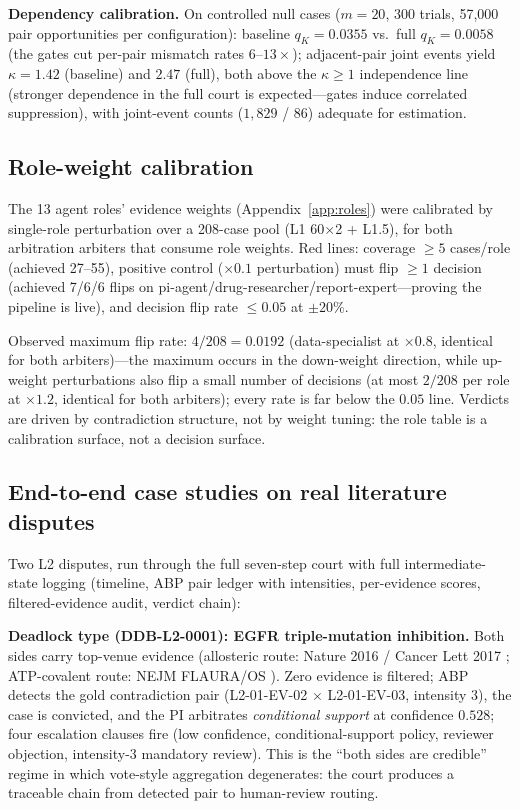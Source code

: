 \documentclass[11pt]{article}
\begin{document}
\textbf{Dependency calibration.} On controlled null cases ($m=20$, 300
trials, 57{,}000 pair opportunities per configuration): baseline
$q_K=0.0355$ vs.\ full $q_K=0.0058$ (the gates cut per-pair mismatch rates
$6$--$13\times$); adjacent-pair joint events yield $\kappa=1.42$ (baseline)
and $2.47$ (full), both above the $\kappa\geq1$ independence line
(stronger dependence in the full court is expected—gates induce
correlated suppression), with joint-event counts ($1{,}829$ / $86$)
adequate for estimation.

\subsection{Role-weight calibration}\label{sec:roles}

The 13 agent roles' evidence weights (Appendix~\ref{app:roles}) were
calibrated by single-role perturbation over a 208-case pool (L1 60$\times$2
+ L1.5), for both arbitration arbiters that consume role weights. Red
lines: coverage $\geq5$ cases/role (achieved 27--55), positive control
($\times0.1$ perturbation) must flip $\geq1$ decision (achieved 7/6/6 flips
on pi-agent/drug-researcher/report-expert—proving the pipeline is live),
and decision flip rate $\leq0.05$ at $\pm20\%$.

Observed maximum flip rate: $4/208=0.0192$ (data-specialist at
$\times0.8$, identical for both arbiters)—the maximum occurs in the
down-weight direction, while up-weight perturbations also flip a small
number of decisions (at most $2/208$ per role at $\times1.2$, identical
for both arbiters); every rate is far below the $0.05$ line. Verdicts are
driven by contradiction structure, not by weight tuning: the role table is
a calibration surface, not a decision surface.

\subsection{End-to-end case studies on real literature disputes}\label{sec:casestudy}

Two L2 disputes, run through the full seven-step court with full
intermediate-state logging (timeline, ABP pair ledger with intensities,
per-evidence scores, filtered-evidence audit, verdict chain):

\textbf{Deadlock type (DDB-L2-0001): EGFR triple-mutation inhibition.}
Both sides carry top-venue evidence (allosteric route: Nature 2016
\citep{jia2016eai045} / Cancer Lett 2017 \citep{wang2017eai045};
ATP-covalent route: NEJM FLAURA/OS
\citep{soria2018osimertinib,ramalingam2020os}). Zero evidence is filtered;
ABP detects the gold contradiction pair (L2-01-EV-02 $\times$ L2-01-EV-03,
intensity 3), the case is convicted, and the PI arbitrates \emph{conditional
support} at confidence $0.528$; four escalation clauses fire (low
confidence, conditional-support policy, reviewer objection, intensity-3
mandatory review). This is the ``both sides are credible'' regime in which
vote-style aggregation degenerates: the court produces a traceable chain
from detected pair to human-review routing.
\end{document}
